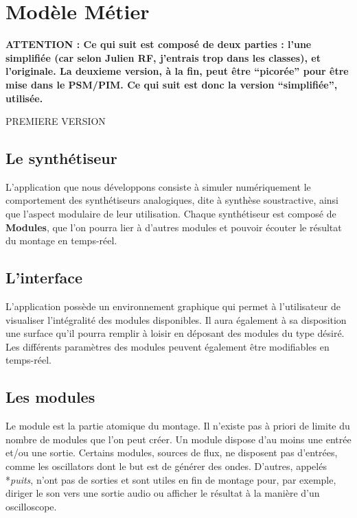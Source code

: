 \section{Modèle Métier}

\textbf{ATTENTION : Ce qui suit est composé de deux parties : l'une simplifiée (car selon Julien RF, j'entrais trop dans les classes), et l'originale. La deuxieme version, à la fin, peut être ``picorée'' pour être mise dans le PSM/PIM. Ce qui suit est donc la version ``simplifiée'', utilisée.}

\Huge{PREMIERE VERSION}\normalsize\\
\subsection{Le synthétiseur}

L'application que nous développons consiste à simuler numériquement
le comportement des synthétiseurs analogiques, dite à synthèse
soustractive, ainsi que l'aspect modulaire de leur utilisation.
Chaque synthétiseur est composé de \textbf{Modules}, que l'on
pourra lier à d'autres modules et pouvoir écouter le résultat du
montage en temps-réel.

\subsection{L'interface}

L'application possède un environnement graphique qui permet à
l'utilisateur de visualiser l'intégralité des modules disponibles.
Il aura également à sa disposition une surface qu'il pourra remplir
à loisir en déposant des modules du type désiré. Les différents
paramètres des modules peuvent également être modifiables en
temps-réel.

\subsection{Les modules}

Le module est la partie atomique du montage. Il n'existe pas à
priori de limite du nombre de modules que l'on peut créer. Un
module dispose d'au moins une entrée et/ou une sortie. Certains
modules, sources de flux, ne disposent pas d'entrées, comme les
oscillators dont le but est de générer des ondes. D'autres, appelés
*\emph{puits}, n'ont pas de sorties et sont utiles en fin de
montage pour, par exemple, diriger le son vers une sortie audio ou
afficher le résultat à la manière d'un oscilloscope.

